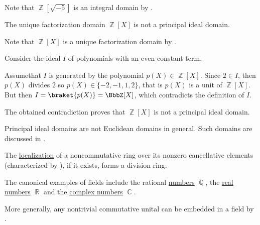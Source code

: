\begin{example}
\begin{refenum}
    Note that \( \BbbZ[\sqrt{-5}] \) is an integral domain by .

    \cite{ProofWiki:polynomials_in_integers_is_not_principal_ideal_domain} The unique factorization domain \( \BbbZ[X] \) is not a principal ideal domain.

    Note that \( \BbbZ[X] \) is a unique factorization domain by .

    Consider the ideal \( I \) of polynomials with an even constant term.

    Assume\LEM that \( I \) is generated by the polynomial \( p(X) \in \BbbZ[X] \). Since \( 2 \in I \), then \( p(X) \) divides \( 2 \) so \( p(X) \in \{ -2, -1, 1, 2 \} \), that is \( p(X) \) is a unit of \( \BbbZ[X] \). But then \( I = \braket{p(X)} = \BbbZ[X] \), which contradicts the definition of \( I \).

    The obtained contradiction proves that \( \BbbZ[X] \) is not a principal ideal domain.

     Principal ideal domains are not Euclidean domains in general. Such domains are discussed in \cite{Anderson1988}.

     The \hyperref[def:ring_localization]{localization} of a noncommutative ring over its nonzero cancellative elements (characterized by ), if it exists, forms a division ring.

     The canonical examples of fields include the rational \hyperref[def:rational_numbers]{numbers} \( \BbbQ \), the \hyperref[def:real_numbers]{real numbers} \( \BbbR \) and the \hyperref[def:complex_numbers]{complex numbers} \( \BbbC \).

    More generally, any nontrivial commutative unital can be embedded in a field by .
  \end{refenum}
\end{example}

